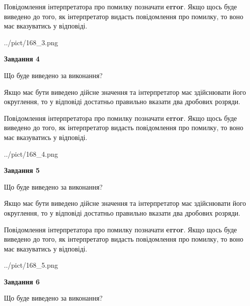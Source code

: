 \documentclass[12pt, ukrainian]{article}
\begin{document}
{\begin {Large}
Повідомлення інтерпретатора про помилку позначати \textbf{error}.
Якщо щось буде виведено до того, як інтерпретатор видасть повідомлення про помилку, 
то воно має вказуватись у відповіді. \par

\begin{center}
	{../pict/168_3.png}
\end{center}
\newpage

{\begin {center}\textbf{Завдання 4}\end {center}}\par
Що буде виведено за виконання? \par

Якщо має бути виведено дійсне значення та інтерпретатор має здійснювати його округлення, 
то у відповіді достатньо правильно вказати два дробових розряди.

Повідомлення інтерпретатора про помилку позначати \textbf{error}.
Якщо щось буде виведено до того, як інтерпретатор видасть повідомлення про помилку, 
то воно має вказуватись у відповіді. \par

\begin{center}
	{../pict/168_4.png}
\end{center}
\newpage

{\begin {center}\textbf{Завдання 5}\end {center}}\par
Що буде виведено за виконання? \par

Якщо має бути виведено дійсне значення та інтерпретатор має здійснювати його округлення, 
то у відповіді достатньо правильно вказати два дробових розряди.

Повідомлення інтерпретатора про помилку позначати \textbf{error}.
Якщо щось буде виведено до того, як інтерпретатор видасть повідомлення про помилку, 
то воно має вказуватись у відповіді. \par

\begin{center}
	{../pict/168_5.png}
\end{center}
\newpage

{\begin {center}\textbf{Завдання 6}\end {center}}\par
Що буде виведено за виконання? \par


\end{Large}}
\end{document}

